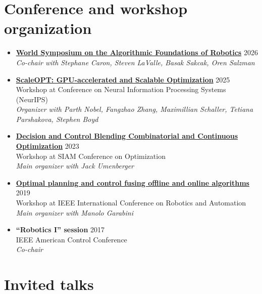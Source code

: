 \documentclass[11pt,a4paper,sans,twoside]{moderncv}
\begin{document}
\section{Conference and workshop organization}


\begin{itemize}

\item \href{https://wafr2026.github.io}{\color{cyan}\textbf{World Symposium on the Algorithmic Foundations of Robotics}} \hfill 2026 \\
\emph{Co-chair with Stephane Caron, Steven LaValle,  Basak Sakcak, Oren Salzman}

\item \href{https://www.cvxgrp.org/scaleopt/}{\color{cyan}\textbf{ScaleOPT: GPU-accelerated and Scalable Optimization}} \hfill 2025 \\
Workshop at Conference on Neural Information Processing Systems (NeurIPS) \\
\emph{Organizer with Parth Nobel, Fangzhao Zhang, Maximillian Schaller, Tetiana Parshakova, Stephen Boyd}

\item \href{https://meetings.siam.org/sess/dsp_programsess.cfm?SESSIONCODE=76788}{\color{cyan}\textbf{Decision and Control Blending Combinatorial and Continuous Optimization}} \hfill 2023 \\
Workshop at SIAM Conference on Optimization \\
\emph{Main organizer with Jack Umenberger}

\item \href{https://sites.google.com/mit.edu/icra19ws}{\color{cyan}\textbf{Optimal planning and control fusing offline and online algorithms}} \hfill 2019 \\
Workshop at IEEE International Conference on Robotics and Automation \\
\emph{Main organizer with Manolo Garabini}

\item \textbf{``Robotics I'' session} \hfill 2017 \\
IEEE American Control Conference \\
\emph{Co-chair}

\end{itemize}

\section{Invited talks}
\end{document}
